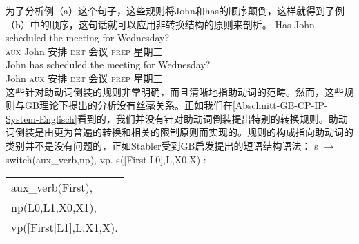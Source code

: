 为了分析例（a）这个句子，这些规则将John和has的顺序颠倒，这样就得到了例（b）中的顺序，这句话就可以应用非转换结构的原则来剖析。
\eal
\ex 
\gll Has John scheduled the meeting for Wednesday?\\
\textsc{aux} John 安排 \textsc{det} 会议 \textsc{prep} 星期三\\
\ex 
\gll John has scheduled the meeting for Wednesday?\\
John \textsc{aux} 安排 \textsc{det} 会议 \textsc{prep} 星期三\\
\zl
这些针对助动词倒装的规则非常明确，而且清晰地指助动词的范畴。然而，这些规则与GB理论下提出的分析没有丝毫关系。正如我们在\ref{Abschnitt-GB-CP-IP-System-Englisch}看到的，我们并没有针对助动词倒装提出特别的转换规则。助动词倒装是由更为普遍的转换\movealphac 和相关的限制原则而实现的。规则的构成指向助动词的类别并不是没有问题的，正如Stabler受到GB启发提出的短语结构语法：
\eal
\ex\label{Regel-Aux-inv-Stabler} s $\to$ switch(aux\_verb,np), vp.
\ex s([First$|$L0],L,X0,X) :- \begin{tabular}[t]{@{}l@{}}
                              aux\_verb(First),\\
                              np(L0,L1,X0,X1),\\
                              vp([First$|$L1],L,X1,X).\\
                              \end{tabular}
